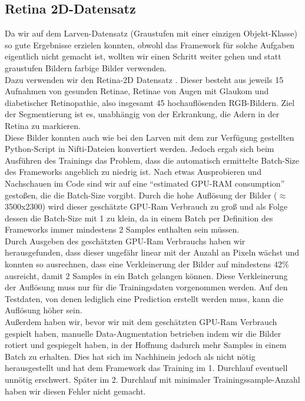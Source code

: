 \subsection{Retina 2D-Datensatz}
Da wir auf dem Larven-Datensatz (Graustufen mit einer einzigen Objekt-Klasse) so gute Ergebnisse erzielen konnten, obwohl das Framework für solche Aufgaben eigentlich nicht gemacht ist, wollten wir einen Schritt weiter gehen und statt graustufen Bildern farbige Bilder verwenden.\\
Dazu verwenden wir den Retina-2D Datensatz \cite{retina2d}. Dieser besteht aus jeweils 15 Aufnahmen von gesunden Retinae, Retinae von Augen mit Glaukom und diabetischer Retinopathie, also insgesamt 45 hochauflösenden RGB-Bildern. Ziel der Segmentierung ist es, unabhängig von der Erkrankung, die Adern in der Retina zu markieren.\\
Diese Bilder konnten auch wie bei den Larven mit dem zur Verfügung gestellten Python-Script \cite{nnunetGithub2D-Pythonscript} in Nifti-Dateien konvertiert werden. Jedoch ergab sich beim Ausführen des Trainings das Problem, dass die automatisch ermittelte Batch-Size des Frameworks angeblich zu niedrig ist. Nach etwas Ausprobieren und Nachschauen im Code sind wir auf eine \enquote{estimated GPU-RAM consumption} \cite{nnunetGithub} gestoßen, die die Batch-Size vorgibt. Durch die hohe Auflösung der Bilder ($\approx$ 3500x2300) wird dieser geschätzte GPU-Ram Verbrauch zu groß und als Folge dessen die Batch-Size mit 1 zu klein, da in einem Batch per Definition des Frameworks immer mindestens 2 Samples enthalten sein müssen.\\
Durch Ausgeben des geschätzten GPU-Ram Verbrauchs haben wir herausgefunden, dass dieser ungefähr linear mit der Anzahl an Pixeln wächst und konnten so ausrechnen, dass eine Verkleinerung der Bilder auf mindestens 42\% ausreicht, damit 2 Samples in ein Batch gelangen können.
Diese Verkleinerung der Auflösung muss nur für die Trainingsdaten vorgenommen werden. Auf den Testdaten, von denen lediglich eine Prediction erstellt werden muss, kann die Auflösung höher sein.\\
Außerdem haben wir, bevor wir mit dem geschätzten GPU-Ram Verbrauch gespielt haben, manuelle Data-Augmentation betrieben indem wir die Bilder rotiert und gespiegelt haben, in der Hoffnung dadurch mehr Samples in einem Batch zu erhalten. Dies hat sich im Nachhinein jedoch als nicht nötig herausgestellt und hat dem Framework das Training im 1. Durchlauf eventuell unnötig erschwert. Später im 2. Durchlauf mit minimaler Trainingssample-Anzahl haben wir diesen Fehler nicht gemacht.
\\\\


